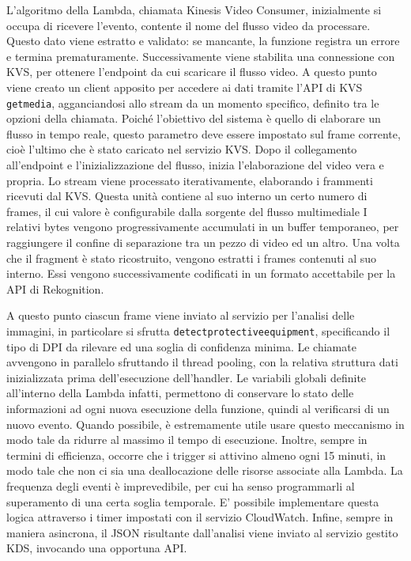 L'algoritmo della Lambda, chiamata Kinesis Video Consumer, inizialmente si occupa di ricevere l'evento, contente il nome del flusso video da processare. Questo dato viene estratto e validato: se mancante, la funzione registra un errore e termina prematuramente. Successivamente viene stabilita una connessione con KVS, per ottenere l'endpoint da cui scaricare il flusso video. A questo punto viene creato un client apposito per accedere ai dati tramite l'API di KVS \texttt{get\textunderscore media}, agganciandosi allo stream da un momento specifico, definito tra le opzioni della chiamata. Poiché l'obiettivo del sistema è quello di elaborare un flusso in tempo reale, questo parametro deve essere impostato sul frame corrente, cioè l'ultimo che è stato caricato nel servizio KVS. Dopo il collegamento all'endpoint e l'inizializzazione del flusso, inizia l'elaborazione del video vera e propria. Lo stream viene processato iterativamente, elaborando i frammenti ricevuti dal KVS. %
Questa unità contiene al suo interno un certo numero di frames, il cui valore è configurabile dalla sorgente del flusso multimediale %
I relativi bytes vengono progressivamente accumulati in un buffer temporaneo, per raggiungere il confine di separazione tra un pezzo di video ed un altro. Una volta che il fragment è stato ricostruito, vengono estratti i frames contenuti al suo interno. Essi vengono successivamente codificati in un formato accettabile per la API di Rekognition. 


A questo punto ciascun frame viene inviato al servizio per l'analisi delle immagini, in particolare si sfrutta \sloppy\texttt{detect\textunderscore protective\textunderscore equipment}\fussy, specificando il tipo di DPI da rilevare ed una soglia di confidenza minima. Le chiamate avvengono in parallelo sfruttando il thread pooling, con la relativa struttura dati inizializzata prima dell'esecuzione dell'handler. Le variabili globali definite all'interno della Lambda infatti, permettono di conservare lo stato delle informazioni ad ogni nuova esecuzione della funzione, quindi al verificarsi di un nuovo evento. Quando possibile, è estremamente utile usare questo meccanismo in modo tale da ridurre al massimo il tempo di esecuzione. Inoltre, sempre in termini di efficienza, occorre che i trigger si attivino almeno ogni 15 minuti, in modo tale che non ci sia una deallocazione delle risorse associate alla Lambda. La frequenza degli eventi è imprevedibile, per cui ha senso programmarli al superamento di una certa soglia temporale. E' possibile implementare questa logica attraverso i timer impostati con il servizio CloudWatch. Infine, sempre in maniera asincrona, il JSON risultante dall'analisi viene inviato al servizio gestito KDS, invocando una opportuna API.




